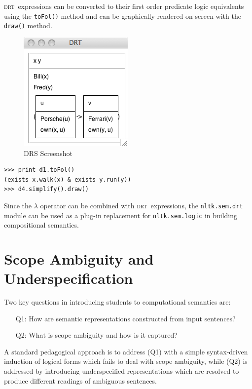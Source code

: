 \documentclass[11pt, a4paper]{article}
\newcommand{\DRT}{\textsc{drt}}
\begin{document}
\noindent
\DRT\ expressions can be converted to their first order predicate
logic equivalents using the \texttt{toFol()} method and can be
graphically rendered on screen with the \texttt{draw()} method.

\begin{figure}
\vspace{-16ex}
\begin{center}
   \includegraphics[scale=.5]{drs.png}
 \end{center}
\vspace{-4ex}
\caption{\small DRS Screenshot} 
\vspace{-10ex}
\end{figure}

\begin{Verbatim}[frame=none]
>>> print d1.toFol()
(exists x.walk(x) & exists y.run(y))
>>> d4.simplify().draw()
\end{Verbatim}

Since the $\lambda$ operator can be combined with \DRT\ expressions,
the \texttt{nltk.sem.drt} module can be used as a plug-in replacement for 
\texttt{nltk.sem.logic} in building compositional semantics.


\section{Scope Ambiguity and Underspecification}

Two key questions in introducing students to computational semantics are:
\begin{enumerate}
\item[Q1:] How are semantic representations constructed from input
  sentences?
\vspace{-2ex}
\item[Q2:] What is scope ambiguity and how is it captured?
\end{enumerate}
A standard pedagogical approach is to address (Q1) with a simple
syntax-driven induction of logical forms which fails to deal with
scope ambiguity, while (Q2) is addressed by introducing underspecified
representations which are resolved to produce different readings of
ambiguous sentences.
\end{document}
